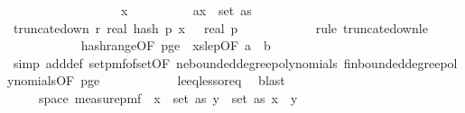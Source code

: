 \begin{isabellebody}
\ \ \ \ \ \ \isamarkupfalse%
\ {\isacharminus}{\kern0pt}\isanewline
\ \ \ \ \ \ \ \ \isamarkupfalse%
\ x\isanewline
\ \ \ \ \ \ \ \ \isamarkupfalse%
\ a{\isacharcolon}{\kern0pt}{\isachardoublequoteopen}x\ {\isasymin}\ set\ as{\isachardoublequoteclose}\isanewline
\ \ \ \ \ \ \ \ \isamarkupfalse%
\ {\isachardoublequoteopen}truncate{\isacharunderscore}{\kern0pt}down\ r\ {\isacharparenleft}{\kern0pt}real\ {\isacharparenleft}{\kern0pt}hash\ p\ x\ {\isasymomega}{\isacharparenright}{\kern0pt}{\isacharparenright}{\kern0pt}\ {\isasymle}\ real\ p{\isachardoublequoteclose}\isanewline
\ \ \ \ \ \ \ \ \ \ \isamarkupfalse%
\ {\isacharparenleft}{\kern0pt}rule\ truncate{\isacharunderscore}{\kern0pt}down{\isacharunderscore}{\kern0pt}le{\isacharparenright}{\kern0pt}\isanewline
\ \ \ \ \ \ \ \ \ \ \isamarkupfalse%
\ hash{\isacharunderscore}{\kern0pt}range{\isacharbrackleft}{\kern0pt}OF\ p{\isacharunderscore}{\kern0pt}ge{\isacharunderscore}{\kern0pt}{}\ {\isacharunderscore}{\kern0pt}\ xs{\isacharunderscore}{\kern0pt}le{\isacharunderscore}{\kern0pt}p{\isacharbrackleft}{\kern0pt}OF\ a{\isacharbrackright}{\kern0pt}{\isacharbrackright}{\kern0pt}\ \ b\isanewline
\ \ \ \ \ \ \ \ \ \ \isamarkupfalse%
\ {\isacharparenleft}{\kern0pt}simp\ add{\isacharcolon}{\kern0pt}{\isasymOmega}def\ set{\isacharunderscore}{\kern0pt}pmf{\isacharunderscore}{\kern0pt}of{\isacharunderscore}{\kern0pt}set{\isacharbrackleft}{\kern0pt}OF\ ne{\isacharunderscore}{\kern0pt}bounded{\isacharunderscore}{\kern0pt}degree{\isacharunderscore}{\kern0pt}polynomials\ fin{\isacharunderscore}{\kern0pt}bounded{\isacharunderscore}{\kern0pt}degree{\isacharunderscore}{\kern0pt}polynomials{\isacharbrackleft}{\kern0pt}OF\ p{\isacharunderscore}{\kern0pt}ge{\isacharunderscore}{\kern0pt}{}{\isacharbrackright}{\kern0pt}{\isacharbrackright}{\kern0pt}{\isacharparenright}{\kern0pt}\isanewline
\ \ \ \ \ \ \ \ \ \ \isamarkupfalse%
\ le{\isacharunderscore}{\kern0pt}eq{\isacharunderscore}{\kern0pt}less{\isacharunderscore}{\kern0pt}or{\isacharunderscore}{\kern0pt}eq\ \isamarkupfalse%
\ blast\isanewline
\ \ \ \ \ \ \isamarkupfalse%
\isanewline
\ \ \ \ \ \isamarkupfalse%
\ \isamarkupfalse%
\ {\isachardoublequoteopen}{\isasymomega}\ {\isasymin}\ {\isacharbraceleft}{\kern0pt}{\isasymomega}\ {\isasymin}\ space\ {\isacharparenleft}{\kern0pt}measure{\isacharunderscore}{\kern0pt}pmf\ {\isasymOmega}\ {\isasymexists}x\ {\isasymin}\ set\ as{\isachardot}{\kern0pt}\ {\isasymexists}y\ {\isasymin}\ set\ as{\isachardot}{\kern0pt}\ x\ {\isasymnoteq}\ y\ {\isasymand}\isanewline

\end{isabellebody}
